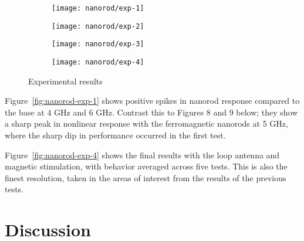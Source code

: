 \begin{figure}[h!]
    \centering
    \begin{subfigure}{0.45\textwidth}
        \centering
        \texttt{[image: nanorod/exp-1]}
        \caption[]{}
        \label{nanorod-exp-1}
    \end{subfigure}
        \begin{subfigure}{0.45\textwidth}
        \centering
        \texttt{[image: nanorod/exp-2]}
        \caption[]{}
        \label{nanorod-exp-2}
    \end{subfigure}
        \begin{subfigure}{0.45\textwidth}
        \centering
        \texttt{[image: nanorod/exp-3]}
        \caption[]{}
        \label{nanorod-exp-3}
    \end{subfigure}
        \begin{subfigure}{0.45\textwidth}
        \centering
        \texttt{[image: nanorod/exp-4]}
        \caption[]{}
        \label{nanorod-exp-4}
    \end{subfigure}
    \caption[Ferromagnetic nanorod experimental results]{Experimental results}
    \label{fig:nanorod-results}
\end{figure}

Figure~\ref{fig:nanorod-exp-1} shows positive spikes in nanorod response compared to the base at 4 GHz and 6 GHz. Contrast this to Figures 8 and 9 below; they show a sharp peak in nonlinear response with the ferromagnetic nanorods at 5 GHz, where the sharp dip in performance occurred in the first test.

Figure~\ref{fig:nanorod-exp-4} shows the final results with the loop antenna and magnetic stimulation, with behavior averaged across five tests. This is also the finest resolution, taken in the areas of interest from the results of the previous tests.

\section{Discussion}
\label{sec:nanorod-discussion}


